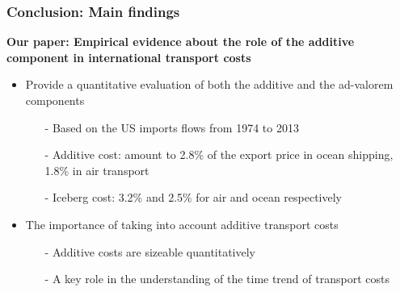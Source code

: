 \documentclass[10 pt,Helvetica, french]{beamer}
\begin{document}
\begin{frame}
\frametitle{Conclusion: Main findings}
\textbf{Our paper: Empirical evidence about the role of the additive component in international transport costs} \vspace{0.1cm}
\pause
\begin{itemize}
\item Provide a quantitative evaluation of both the additive and the ad-valorem components \vspace{0.1cm}
\begin{itemize}
\item[-] Based on the US imports flows from 1974 to 2013 \vspace{0.1cm}
\item[-] Additive cost: amount to 2.8\% of the export price in ocean shipping, 1.8\% in air transport \vspace{0.1cm}
\item[-] Iceberg cost: 3.2\% and 2.5\% for air and ocean respectively \vspace{0.1cm}
\end{itemize}
\pause
\item The importance of taking into account additive transport costs \vspace{0.1cm}
\begin{itemize}
\item[-] Additive costs are sizeable quantitatively \vspace{0.1cm}
\item[-] A key role in the understanding of the time trend of transport costs
\end{itemize}

\end{itemize}

\end{frame}

\end{document}
